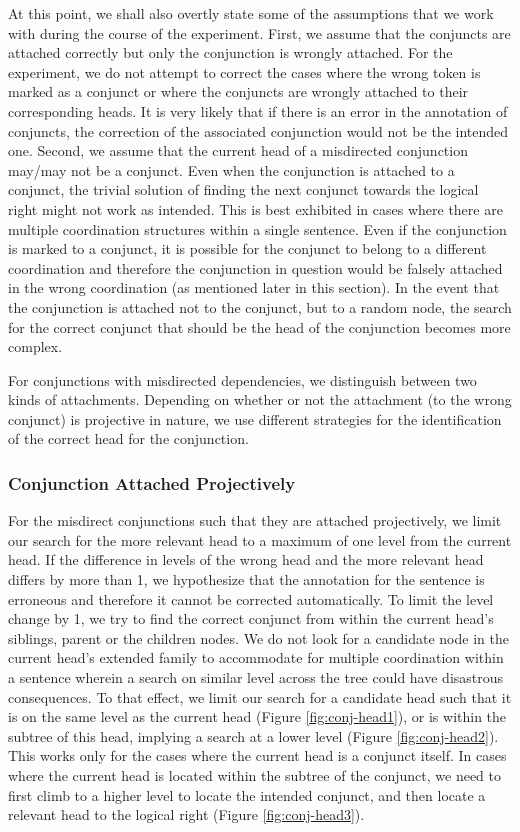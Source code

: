 At this point, we shall also overtly state some of the assumptions that we work with during the course of the experiment. First, we assume that the conjuncts are attached correctly but only the conjunction is wrongly attached. For the experiment, we do not attempt to correct the cases where the wrong token is marked as a conjunct or where the conjuncts are wrongly attached to their corresponding heads. It is very likely that if there is an error in the annotation of conjuncts, the correction of the associated conjunction would not be the intended one. Second, we assume that the current head of a misdirected conjunction may/may not be a conjunct. Even when the conjunction is attached to a conjunct, the trivial solution of finding the next conjunct towards the logical right might not work as intended. This is best exhibited in cases where there are multiple coordination structures within a single sentence. Even if the conjunction is marked to a conjunct, it is possible for the conjunct to belong to a different coordination and therefore the conjunction in question would be falsely attached in the wrong coordination (as mentioned later in this section). In the event that the conjunction is attached not to the conjunct, but to a random node, the search for the correct conjunct that should be the head of the conjunction becomes more complex.

For conjunctions with misdirected dependencies, we distinguish between two kinds of attachments. Depending on whether or not the attachment (to the wrong conjunct) is projective in nature, we use different strategies for the identification of the correct head for the conjunction.

\subsubsection{Conjunction Attached Projectively}

For the misdirect conjunctions such that they are attached projectively, we limit our search for the more relevant head to a maximum of one level from the current head. If the difference in levels of the wrong head and the more relevant head differs by more than 1, we hypothesize that the annotation for the sentence is erroneous and therefore it cannot be corrected automatically. To limit the level change by 1, we try to find the correct conjunct from within the current head's siblings, parent or the children nodes. We do not look for a candidate node in the current head's extended family to accommodate for multiple coordination within a sentence wherein a search on similar level across the tree could have disastrous consequences. To that effect, we limit our search for a candidate head such that it is on the same level as the current head (Figure \ref{fig:conj-head1}), or is within the subtree of this head, implying a search at a lower level (Figure \ref{fig:conj-head2}). This works only for the cases where the current head is a conjunct itself. In cases where the current head is located within the subtree of the conjunct, we need to first climb to a higher level to locate the intended conjunct, and then locate a relevant head to the logical right (Figure \ref{fig:conj-head3}). 

